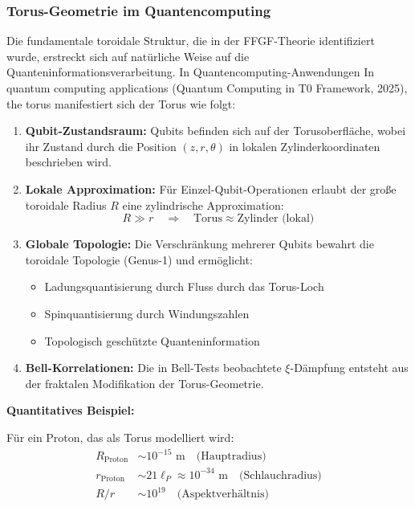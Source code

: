 \documentclass[12pt,a4paper]{article}
\begin{document}
	\subsubsection{Torus-Geometrie im Quantencomputing}
	
	Die fundamentale toroidale Struktur, die in der FFGF-Theorie identifiziert wurde, erstreckt sich auf natürliche Weise auf die Quanteninformationsverarbeitung. In Quantencomputing-Anwendungen In quantum computing applications (Quantum Computing in T0 Framework, 2025), the torus manifestiert sich der Torus wie folgt:
	
	\begin{enumerate}
		\item \textbf{Qubit-Zustandsraum:} Qubits befinden sich auf der Torusoberfläche, wobei ihr Zustand durch die Position $(z, r, \theta)$ in lokalen Zylinderkoordinaten beschrieben wird.
		
		\item \textbf{Lokale Approximation:} Für Einzel-Qubit-Operationen erlaubt der große toroidale Radius $R$ eine zylindrische Approximation:
		\[
		R \gg r \quad \Rightarrow \quad 
		\text{Torus} \approx \text{Zylinder (lokal)}
		\]
		
		\item \textbf{Globale Topologie:} Die Verschränkung mehrerer Qubits bewahrt die toroidale Topologie (Genus-1) und ermöglicht:
		\begin{itemize}
			\item Ladungsquantisierung durch Fluss durch das Torus-Loch
			\item Spinquantisierung durch Windungszahlen
			\item Topologisch geschützte Quanteninformation
		\end{itemize}
		
		\item \textbf{Bell-Korrelationen:} Die in Bell-Tests beobachtete $\xi$-Dämpfung entsteht aus der fraktalen Modifikation der Torus-Geometrie.
	\end{enumerate}
	
	\textbf{Quantitatives Beispiel:}
	
	Für ein Proton, das als Torus modelliert wird:
	\begin{align}
		R_{\text{Proton}} &\sim 10^{-15} \text{ m} \quad \text{(Hauptradius)} \\
		r_{\text{Proton}} &\sim 21\ell_P \approx 10^{-34} \text{ m} \quad 
		\text{(Schlauchradius)} \\
		R/r &\sim 10^{19} \quad \text{(Aspektverhältnis)}
	\end{align}
	
\end{document}
